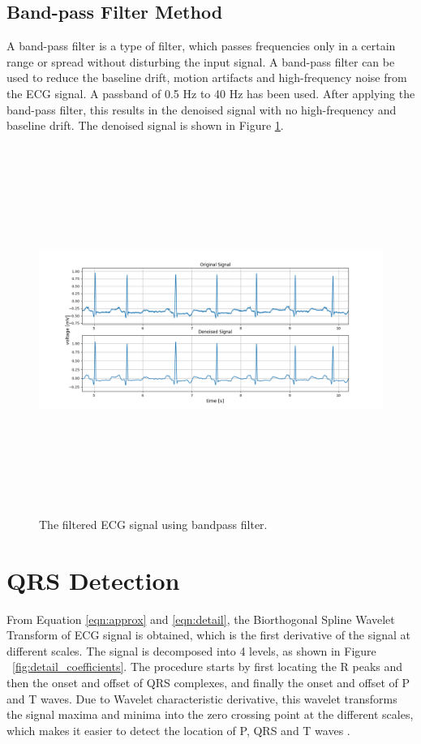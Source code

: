 \subsection{Band-pass Filter Method}
A band-pass filter is a type of filter, which passes frequencies only in a certain range or spread without disturbing the input signal. A band-pass filter can be used to reduce the baseline drift, motion artifacts and high-frequency noise from the ECG signal. A passband of 0.5 Hz to 40 Hz has been used. After applying the band-pass filter, this results in the denoised signal with no high-frequency and baseline drift. The denoised signal is shown in Figure \ref{fig:bandpass_denoised}. 

\begin{figure}[h]
	\centering
	\includegraphics[width=15cm,height=12cm,keepaspectratio=true]{images/bandpass_denoised_1}
	\caption{
		The filtered ECG signal using bandpass filter.
	}
	\label{fig:bandpass_denoised}
\end{figure}


\section{QRS Detection}\label{sec:ecg_det}

From Equation \ref{eqn:approx} and \ref{eqn:detail}, the Biorthogonal Spline Wavelet Transform of ECG signal is obtained, which is the first derivative of the signal at different scales. The signal is decomposed into 4 levels, as shown in  Figure ~\ref{fig:detail_coefficients}. The procedure starts by first locating the R peaks and then the onset and offset of QRS complexes, and finally the onset and offset of P and T waves. Due to Wavelet characteristic derivative, this wavelet transforms the signal maxima and minima into the zero crossing point at the different scales, which makes it easier to detect the location of P, QRS and T waves \cite{e2010cardiac}.



